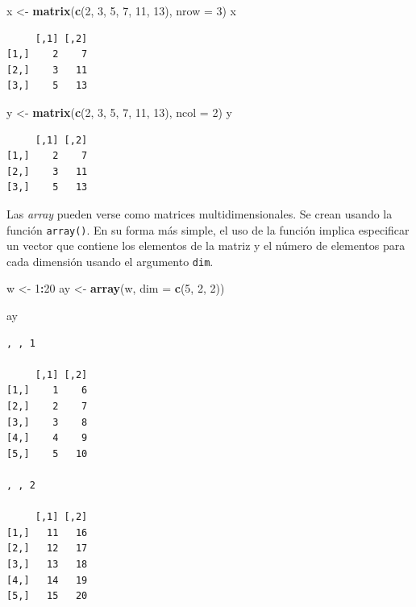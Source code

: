 \documentclass[
]{article}
\newenvironment{Shaded}{\begin{snugshade}}{\end{snugshade}}
\newcommand{\AttributeTok}[1]{\textcolor[rgb]{0.13,0.29,0.53}{#1}}
\newcommand{\DecValTok}[1]{\textcolor[rgb]{0.00,0.00,0.81}{#1}}
\newcommand{\FunctionTok}[1]{\textcolor[rgb]{0.13,0.29,0.53}{\textbf{#1}}}
\newcommand{\NormalTok}[1]{#1}
\newcommand{\OtherTok}[1]{\textcolor[rgb]{0.56,0.35,0.01}{#1}}
\newcommand{\SpecialCharTok}[1]{\textcolor[rgb]{0.81,0.36,0.00}{\textbf{#1}}}
\begin{document}
\begin{Shaded}
\begin{Highlighting}[]
\NormalTok{x }\OtherTok{\textless{}{-}} \FunctionTok{matrix}\NormalTok{(}\FunctionTok{c}\NormalTok{(}\DecValTok{2}\NormalTok{, }\DecValTok{3}\NormalTok{, }\DecValTok{5}\NormalTok{, }\DecValTok{7}\NormalTok{, }\DecValTok{11}\NormalTok{, }\DecValTok{13}\NormalTok{), }\AttributeTok{nrow =} \DecValTok{3}\NormalTok{)}
\NormalTok{x}
\end{Highlighting}
\end{Shaded}

\begin{verbatim}
     [,1] [,2]
[1,]    2    7
[2,]    3   11
[3,]    5   13
\end{verbatim}

\begin{Shaded}
\begin{Highlighting}[]
\NormalTok{y }\OtherTok{\textless{}{-}} \FunctionTok{matrix}\NormalTok{(}\FunctionTok{c}\NormalTok{(}\DecValTok{2}\NormalTok{, }\DecValTok{3}\NormalTok{, }\DecValTok{5}\NormalTok{, }\DecValTok{7}\NormalTok{, }\DecValTok{11}\NormalTok{, }\DecValTok{13}\NormalTok{), }\AttributeTok{ncol =} \DecValTok{2}\NormalTok{)}
\NormalTok{y}
\end{Highlighting}
\end{Shaded}

\begin{verbatim}
     [,1] [,2]
[1,]    2    7
[2,]    3   11
[3,]    5   13
\end{verbatim}

Las \emph{array} pueden verse como matrices multidimensionales. Se crean usando la función \texttt{array()}. En su forma más simple, el uso de la función implica especificar un vector que contiene los elementos de la matriz y el número de elementos para cada dimensión usando el argumento \texttt{dim}.

\begin{Shaded}
\begin{Highlighting}[]
\NormalTok{w }\OtherTok{\textless{}{-}} \DecValTok{1}\SpecialCharTok{:}\DecValTok{20}
\NormalTok{ay }\OtherTok{\textless{}{-}} \FunctionTok{array}\NormalTok{(w, }\AttributeTok{dim =} \FunctionTok{c}\NormalTok{(}\DecValTok{5}\NormalTok{, }\DecValTok{2}\NormalTok{, }\DecValTok{2}\NormalTok{))}

\NormalTok{ay}
\end{Highlighting}
\end{Shaded}

\begin{verbatim}
, , 1

     [,1] [,2]
[1,]    1    6
[2,]    2    7
[3,]    3    8
[4,]    4    9
[5,]    5   10

, , 2

     [,1] [,2]
[1,]   11   16
[2,]   12   17
[3,]   13   18
[4,]   14   19
[5,]   15   20
\end{verbatim}
\end{document}
